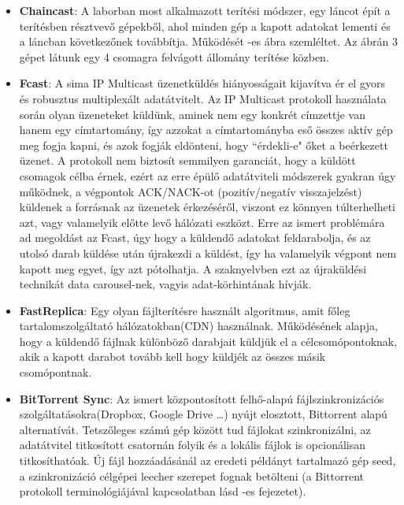 \begin{itemize}
  \item \textbf{Chaincast}: A laborban most alkalmazott terítési módszer, egy láncot épít a terítésben résztvevő gépekből, ahol minden gép a kapott adatokat lementi és a láncban következőnek továbbítja. Működését -es ábra szemléltet. Az ábrán 3 gépet látunk egy 4 csomagra felvágott állomány terítése közben.
  \item \textbf{Fcast}\cite{gemmell2000fcast}: A sima IP Multicast üzenetküldés hiányosságait kijavítva ér el gyors és robusztus multiplexált adatátvitelt. Az IP Multicast protokoll használata során olyan üzeneteket küldünk, aminek nem egy konkrét címzettje van hanem egy címtartomány, így azzokat a címtartományba eső összes aktív gép meg fogja kapni, és azok fogják eldönteni, hogy ``érdekli-e" őket a beérkezett üzenet. A protokoll nem biztosít semmilyen garanciát, hogy a küldött csomagok célba érnek, ezért az erre épülő adatátviteli módszerek gyakran úgy működnek, a végpontok ACK/NACK-ot (pozitív/negatív visszajelzést) küldenek a forrásnak az üzenetek érkezéséről, viszont ez könnyen túlterhelheti azt, vagy valamelyik előtte levő hálózati eszközt. Erre az ismert problémára ad megoldást az Fcast, úgy hogy a küldendő adatokat feldarabolja, és az utolsó darab küldése után újrakezdi a küldést, így ha valamelyik végpont nem kapott meg egyet, így azt pótolhatja. A szaknyelvben ezt az újraküldési technikát data carousel-nek, vagyis adat-körhintának hívják.
  \item \textbf{FastReplica}\cite{cherkasova2003fastreplica}:  Egy olyan fájlterítésre használt algoritmus, amit főleg tartalomszolgáltató hálózatokban(CDN) használnak. Működésének alapja, hogy a küldendő fájlnak különböző darabjait küldjük el a célcsomópontoknak, akik a kapott darabot tovább kell hogy küldjék az összes másik csomópontnak.
  \item \textbf{BitTorrent Sync}\cite{farina2014bittorrent}: Az ismert központosított felhő-alapú fájlszinkronizációs szolgáltatásokra(Dropbox, Google Drive \ldots) nyújt elosztott, Bittorrent alapú alternatívát. Tetszőleges számú gép között tud fájlokat szinkronizálni, az adatátvitel titkosított csatornán folyik és a lokális fájlok is opcionálisan titkosíthatóak. Új fájl hozzáadásánál az eredeti példányt tartalmazó gép seed, a szinkronizáció célgépei leecher szerepet fognak betölteni (a Bittorrent protokoll terminológiájával kapcsolatban lásd -es fejezetet).
\end{itemize}

